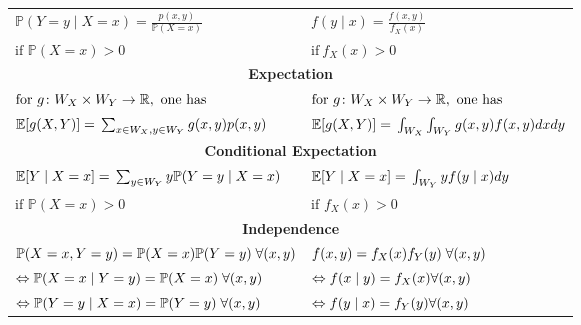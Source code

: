 {\begin{tabularx}{\linewidth}{p{.5\linewidth} p{.5\linewidth}}
        $\mathbb{P}(Y=y\mid X=x)=\frac{p(x,y)}{\mathbb{P}(X=x)}$                          & $f(y\mid x)=\frac{f(x,y)}{f_X(x)}$                                       \\
        $\text{if }\mathbb{P}(X=x)>0$                                                     & $\mathrm{if~}f_X(x)>0$                                                   \\
        \multicolumn{2}{c}{\textbf{Expectation}}                                                                                                                     \\
        $\text{for }g\colon W_X\times W_Y\to\mathbb{R},\newline \text{ one has}$          & $\text{for }g\colon W_X\times W_Y\to\mathbb{R},\newline \text{ one has}$ \\
        $\mathbb{E}[g(X,Y)]=\newline\sum_{x\in W_X,y\in W_Y}g(x,y)p(x,y)$                 & $\mathbb{E}[g(X,Y)]=\newline\int_{W_X}\int_{W_Y}g(x,y)f(x,y)dxdy$        \\
        \multicolumn{2}{c}{\textbf{Conditional Expectation}}                                                                                                         \\
        $\mathbb{E}[Y\mid X=x]=\newline \sum_{y\in W_Y}y\mathbb{P}(Y=y\mid X=x)$          & $\mathbb{E}[Y\mid X=x]=\newline \int_{W_Y}yf(y\mid x)dy$                 \\
        $\text{if }\mathbb{P}(X=x)>0$                                                     & $\text{if }f_X(x)>0$                                                     \\
        \multicolumn{2}{c}{\textbf{Independence}}                                                                                                                    \\
        $\mathbb{P}(X=x,Y=y)=\newline \mathbb{P}(X=x)\mathbb{P}(Y=y)\; \forall(x,y)$      & $f(x,y)=\newline f_X(x)f_Y(y)\; \forall(x,y)$                            \\
        $\Leftrightarrow\mathbb{P}(X=x\mid Y=y)=\newline \mathbb{P}(X=x)\; \forall(x,y)$  & $\Leftrightarrow f(x\mid y) =f_X(x)\newline\forall(x,y)$                 \\
        $\Leftrightarrow\mathbb{P}(Y=y\mid X=x)=\newline \mathbb{P}(Y=y)\; \forall(x,y) $ & $\Leftrightarrow f(y\mid x) =f_Y(y)\newline\forall(x,y)$                 \\
    \end{tabularx}
} %

